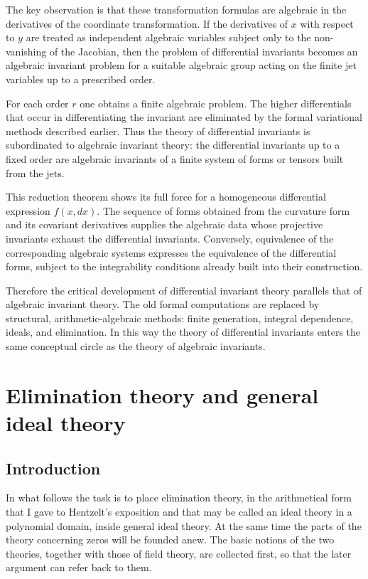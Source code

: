\documentclass[11pt]{article}
\begin{document}
The key observation is that these transformation formulas are algebraic in the derivatives of the coordinate transformation. If the derivatives of $x$ with respect to $y$ are treated as independent algebraic variables subject only to the non-vanishing of the Jacobian, then the problem of differential invariants becomes an algebraic invariant problem for a suitable algebraic group acting on the finite jet variables up to a prescribed order.

For each order $r$ one obtains a finite algebraic problem. The higher differentials that occur in differentiating the invariant are eliminated by the formal variational methods described earlier. Thus the theory of differential invariants is subordinated to algebraic invariant theory: the differential invariants up to a fixed order are algebraic invariants of a finite system of forms or tensors built from the jets.

This reduction theorem shows its full force for a homogeneous differential expression $f(x,dx)$. The sequence of forms obtained from the curvature form and its covariant derivatives supplies the algebraic data whose projective invariants exhaust the differential invariants. Conversely, equivalence of the corresponding algebraic systems expresses the equivalence of the differential forms, subject to the integrability conditions already built into their construction.

Therefore the critical development of differential invariant theory parallels that of algebraic invariant theory. The old formal computations are replaced by structural, arithmetic-algebraic methods: finite generation, integral dependence, ideals, and elimination. In this way the theory of differential invariants enters the same conceptual circle as the theory of algebraic invariants.

\newpage

\section{Elimination theory and general ideal theory}

\subsection*{Introduction}

In what follows the task is to place elimination theory, in the arithmetical form that I gave to Hentzelt's exposition and that may be called an ideal theory in a polynomial domain, inside general ideal theory. At the same time the parts of the theory concerning zeros will be founded anew. The basic notions of the two theories, together with those of field theory, are collected first, so that the later argument can refer back to them.
\end{document}
